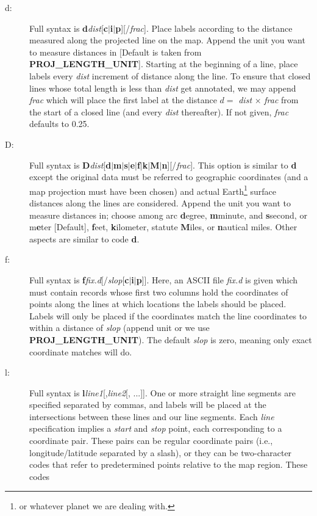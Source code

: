 \begin{description}
\item [d:] Full syntax is \textbf{d}\emph{dist}[\textbf{c$|$i$|$p}][/\emph{frac}].
Place labels according to the distance measured along the projected line on the map.  Append the
unit you want to measure distances in [Default is taken from \textbf{PROJ\_LENGTH\_UNIT}].
Starting at the beginning of a line, place labels every \emph{dist} increment of
distance along the line.  To ensure that closed lines whose total length is less
than \emph{dist} get annotated, we may append \emph{frac} which will place the first
label at the distance $d =$ \emph{dist} $\times$ \emph{frac} from the start of a closed
line (and every \emph{dist} thereafter).  If not given, \emph{frac} defaults to 0.25.
\item [D:] Full syntax is \textbf{D}\emph{dist}[\textbf{d$|$m$|$s$|$e$|$f$|$k$|$M$|$n}][/\emph{frac}].
This option is similar to \textbf{d} except the original data must be referred to geographic
coordinates (and a map projection must have been chosen) and actual Earth\footnote{or whatever
planet we are dealing with.} surface distances along the lines are considered.  Append the
unit you want to measure distances in; choose among arc \textbf{d}egree, \textbf{m}minute, and \textbf{s}second,
or m\textbf{e}ter [Default], \textbf{f}eet, \textbf{k}ilometer, statute \textbf{M}iles, or \textbf{n}autical miles.  Other aspects are similar to code \textbf{d}.
\item [f:] Full syntax is \textbf{f}\emph{fix.d}[/\emph{slop}[\textbf{c$|$i$|$p}]].  Here, an ASCII file \emph{fix.d} is
given which must contain records whose first two columns hold the coordinates of points along
the lines at which locations the labels should be placed.  Labels will only be placed if the coordinates
match the line coordinates to within a distance of \emph{slop} (append unit or we use \textbf{PROJ\_LENGTH\_UNIT}).
The default \emph{slop} is zero, meaning only exact coordinate matches will do.
\item [l:] Full syntax is \textbf{l}\emph{line1}[,\emph{line2}[, ...]].  One or more straight line segments
are specified separated by commas, and labels will be placed at the intersections between these lines and
our line segments.  Each \emph{line} specification implies a \emph{start} and \emph{stop} point, each
corresponding to a coordinate pair.  These pairs can be regular coordinate pairs (i.e., longitude/latitude separated by a slash), or they
can be two-character codes that refer to predetermined points relative to the map region.  These codes

\end{description}
